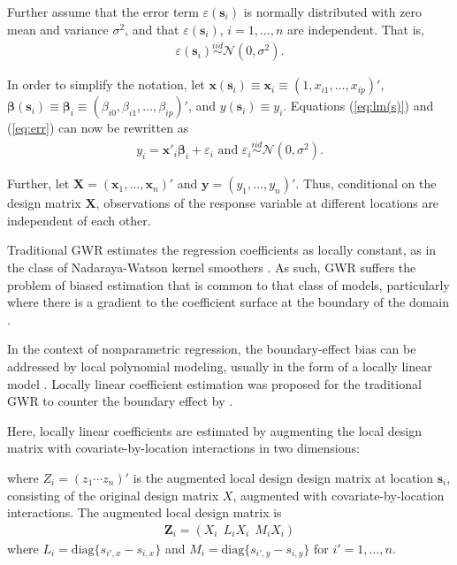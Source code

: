 \documentclass[authoryear, review, 11pt]{elsarticle}
\begin{document}
	Further assume that the error term $\varepsilon(\bm{s}_i)$ is normally distributed with zero mean and variance $\sigma^2$, and that $\varepsilon(\bm{s}_i)$, $i=1, \dots, n$ are independent. That is,
	\begin{align} \label{eq:err}
		\varepsilon(\bm{s}_i) \overset{iid}{\sim} \mathcal{N} \left( 0,\sigma^2 \right).
	\end{align}
	
	In order to simplify the notation, let $\bm{x}(\bm{s}_i) \equiv \bm{x}_i \equiv \left( 1, x_{i1}, \dots, x_{ip} \right)'$, $\bm{\beta}(\bm{s}_i) \equiv \bm{\beta}_i \equiv \left(\beta_{i0}, \beta_{i1}, \dots, \beta_{ip} \right)'$, and $y(\bm{s}_i) \equiv y_i$.  Equations (\ref{eq:lm(s)}) and (\ref{eq:err}) can now be rewritten as
	\begin{align}
		y_i = \bm{x}'_i \bm{\beta}_i + \varepsilon_i \text{ and } \varepsilon_i \overset{iid}{\sim} \mathcal{N} \left( 0,\sigma^2 \right).
	\end{align}
	
	Further, let $\bm{X} = \left( \bm{x}_1, \dots, \bm{x}_n \right)'$ and $\bm{y} = \left( y_1, \dots, y_n \right)'$. Thus, conditional on the design matrix $\bm{X}$, observations of the response variable at different locations are independent of each other.
  
  Traditional GWR estimates the regression coefficients as locally constant, as in the class of Nadaraya-Watson kernel smoothers \citep{Hardle-1990}. As such, GWR suffers the problem of biased estimation that is common to that class of models, particularly where there is a gradient to the coefficient surface at the boundary of the domain \citep{Hastie:1993b}.

  In the context of nonparametric regression, the boundary-effect bias can be addressed by local polynomial modeling, usually in the form of a locally linear model \citep{Fan-1996}. Locally linear coefficient estimation was proposed for the traditional GWR to counter the boundary effect by \cite{Wang:2008b}.

  Here, locally linear coefficients are estimated by augmenting the local design matrix with covariate-by-location interactions in two dimensions:
  
  
  
	where $Z_i  = \left(z_1 \cdots z_n\right)'$ is the augmented local design design matrix at location $\bm{s}_i$, consisting of the original design matrix $X$, augmented with covariate-by-location interactions. The augmented local design matrix is
	\begin{align}
		\bm{Z}_i = \left( X_i  \:\: L_i X_i \:\: M_i X_i \right)
	\end{align}
	where $L_i = \text{diag}\{s_{i',x} - s_{i,x}\}$ and $M_i = \text{diag}\{s_{i',y} - s_{i,y}\}$ for $i' = 1, \dots, n$.
  
\end{document}
